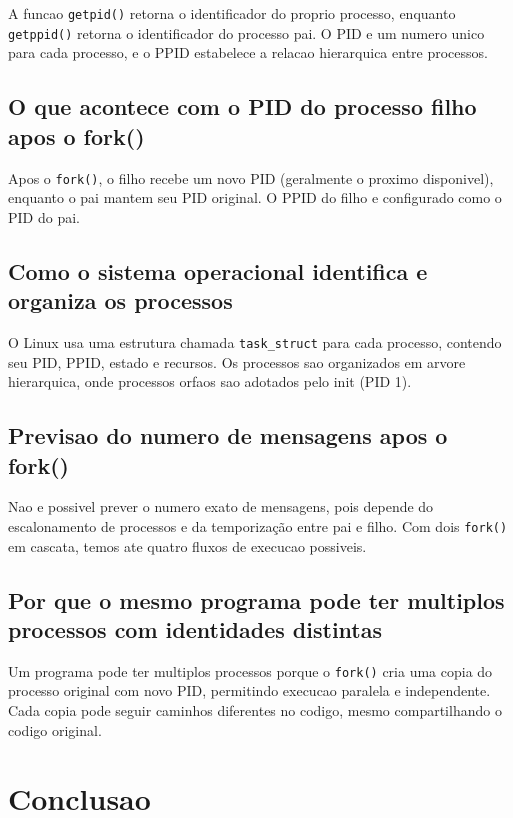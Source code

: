 \documentclass[12pt]{article}
\begin{document}
A funcao \texttt{getpid()} retorna o identificador do proprio processo, enquanto \texttt{getppid()} retorna o identificador do processo pai. O PID e um numero unico para cada processo, e o PPID estabelece a relacao hierarquica entre processos.

\subsection{O que acontece com o PID do processo filho apos o fork()}

Apos o \texttt{fork()}, o filho recebe um novo PID (geralmente o proximo disponivel), enquanto o pai mantem seu PID original. O PPID do filho e configurado como o PID do pai.

\subsection{Como o sistema operacional identifica e organiza os processos}

O Linux usa uma estrutura chamada \texttt{task\_struct} para cada processo, contendo seu PID, PPID, estado e recursos. Os processos sao organizados em arvore hierarquica, onde processos orfaos sao adotados pelo init (PID 1).

\subsection{Previsao do numero de mensagens apos o fork()}

Nao e possivel prever o numero exato de mensagens, pois depende do escalonamento de processos e da temporização entre pai e filho. Com dois \texttt{fork()} em cascata, temos ate quatro fluxos de execucao possiveis.

\subsection{Por que o mesmo programa pode ter multiplos processos com identidades distintas}

Um programa pode ter multiplos processos porque o \texttt{fork()} cria uma copia do processo original com novo PID, permitindo execucao paralela e independente. Cada copia pode seguir caminhos diferentes no codigo, mesmo compartilhando o codigo original.

\section{Conclusao}
\end{document}
